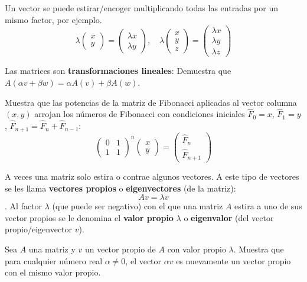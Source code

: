Un vector se puede estirar/encoger multiplicando todas las entradas por un mismo factor, por ejemplo. 
$$
\lambda
\left(\begin{array}{c}
x \\
y
\end{array}\right)
=
\left(\begin{array}{c}
\lambda x \\
\lambda y
\end{array}\right),
\quad 
\lambda
\left(\begin{array}{c}
x \\
y \\
z
\end{array}\right)
=
\left(\begin{array}{c}
\lambda x \\
\lambda y \\
\lambda z
\end{array}\right)
$$

\begin{ejercicio}
Las matrices son {\bf transformaciones lineales}: Demuestra que $A(\alpha v+\beta w)=\alpha A(v)+\beta A(w)$. 
\end{ejercicio}

\begin{ejercicio}
Muestra que las potencias de la matriz de Fibonacci aplicadas al vector columna $(x,y)$ arrojan los números de Fibonacci con condiciones iniciales $\hat F_0=x$, $\hat F_1=y$, $\hat F_{n+1}=\hat F_n+\hat F_{n-1}$:
$$
\left(\begin{array}{cc}
0&1 \\
1&1
\end{array}\right)^n
\left(\begin{array}{c}
x \\
y
\end{array}\right)
=
\left(\begin{array}{c}
\hat F_n \\
\hat F_{n+1}
\end{array}\right)
$$
\end{ejercicio}

A veces una matriz solo estira o contrae algunos vectores. A este tipo de vectores se les llama {\bf vectores propios} o {\bf eigenvectores} (de la matriz):  $$Av=\lambda v$$. Al factor $\lambda$ (que puede ser negativo) con el que una matriz $A$ estira a uno de sus vector propios se le denomina el {\bf valor propio}  $\lambda$ o {\bf eigenvalor} (del vector propio/eigenvector $v$).

\begin{ejercicio}
Sea $A$ una matriz y $v$ un vector propio de $A$ con valor propio $\lambda$. Muestra que para cualquier número real $\alpha\neq 0$, el vector $\alpha v$ es nuevamente un vector propio con el mismo valor propio.   
\end{ejercicio}

